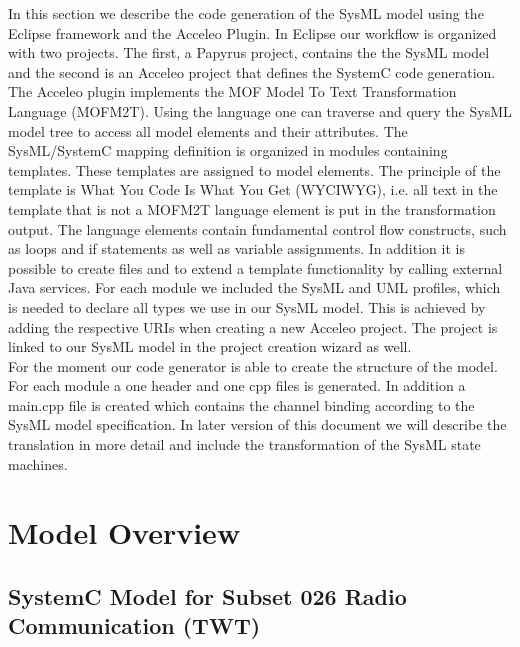 \documentclass{template/openetcs_article}
\begin{document}
In this section we describe the code generation of the SysML model using the Eclipse framework and the Acceleo Plugin.
In Eclipse our workflow is organized with two projects. The first, a Papyrus project, contains the the SysML model and the second is an Acceleo project that defines the SystemC code generation. The Acceleo plugin implements the MOF Model To Text Transformation Language (MOFM2T). Using the language one can traverse and query the SysML model tree to access all model elements and their attributes. The SysML/SystemC mapping definition is organized in modules containing templates. These templates are assigned to model elements. The principle of the template is What You Code Is What You Get (WYCIWYG), i.e. all text in the template that is not a MOFM2T language element is put in the transformation output. The language elements contain fundamental control flow constructs, such as loops and if statements as well as variable assignments. In addition it is possible to create files and to extend a template functionality by calling external Java services. For each module we included the SysML and UML profiles, which is needed to declare all types we use in our SysML model. This is achieved by adding the respective URIs when creating a new Acceleo project. The project is linked to our SysML model in the project creation wizard as well.\\

For the moment our code generator is able to create the structure of the model. For each module a one header and one cpp files is generated. In addition a main.cpp file is created which contains the channel binding according to the SysML model specification. In later version of this document we will describe the translation in more detail and include the transformation of the SysML state machines.


\section{Model Overview}
\label{sec:model-overview}

\subsection{SystemC Model for Subset 026 Radio Communication (TWT)}
\end{document}
